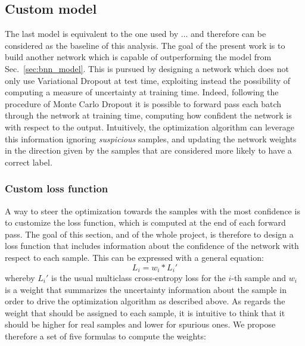 \documentclass[11pt,twoside,a4paper]{article}
\begin{document}
\subsection{Custom model}
\label{sec:custom_model}
The last model is equivalent to the one used by ... and therefore can be considered as the baseline of this analysis. The goal of the present work is to build another network which is capable of outperforming the model from Sec.~\ref{sec:bnn_model}.\newline
This is pursued by designing a network which does not only use Variational Dropout at test time, exploiting instead the possibility of computing a measure of uncertainty at training time. Indeed, following the procedure of Monte Carlo Dropout it is possible to forward pass each batch through the network at training time, computing how confident the network is with respect to the output. Intuitively, the optimization algorithm can leverage this information ignoring \textit{suspicious} samples, and updating the network weights in the direction given by the samples that are considered more likely to have a correct label.\newline

\subsubsection{Custom loss function}
A way to steer the optimization towards the samples with the most confidence is to customize the loss function, which is computed at the end of each forward pass. The goal of this section, and of the whole project, is therefore to design a loss function that includes information about the confidence of the network with respect to each sample. This can be expressed with a general equation:
\begin{equation}
\label{eq1}
L_{i} = w_{i} * {L_{i}}'
\end{equation}
whereby \({L_{i}}'\) is the usual multiclass cross-entropy loss for the \(i\)-th sample and \(w_{i}\) is a weight that summarizes the uncertainty information about the sample in order to drive the optimization algorithm as described above.\newline
As regards the weight that should be assigned to each sample, it is intuitive to think that it should be higher for real samples and lower for spurious ones. We propose therefore a set of five formulas to compute the weights:
\end{document}
